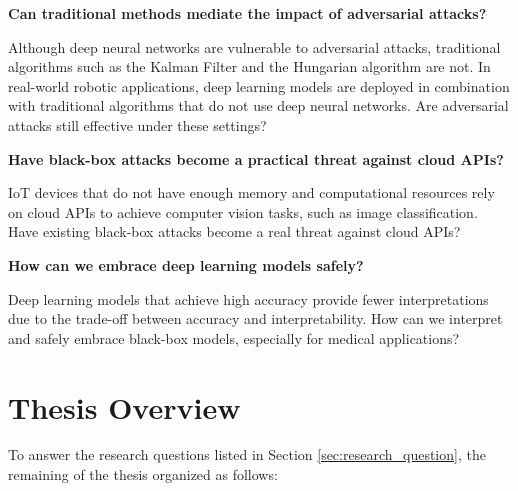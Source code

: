 \vspace{0.5cm}

\textbf{Can traditional methods mediate the impact of adversarial attacks?}

Although deep neural networks are vulnerable to adversarial attacks, traditional algorithms such as the Kalman Filter and the Hungarian algorithm are not. In real-world robotic applications, deep learning models are deployed in combination with traditional algorithms that do not use deep neural networks. Are adversarial attacks still effective under these settings?

\vspace{0.5cm}

\textbf{Have black-box attacks become a practical threat against cloud APIs?}

IoT devices that do not have enough memory and computational resources rely on cloud APIs to achieve computer vision tasks, such as image classification. Have existing black-box attacks become a real threat against cloud APIs?

\vspace{0.5cm}

\textbf{How can we embrace deep learning models safely?}

Deep learning models that achieve high accuracy provide fewer interpretations due to the trade-off between accuracy and interpretability. How can we interpret and safely embrace black-box models, especially for medical applications?



\section{Thesis Overview}

To answer the research questions listed in Section \ref{sec:research_question}, the remaining of the thesis organized as follows:


